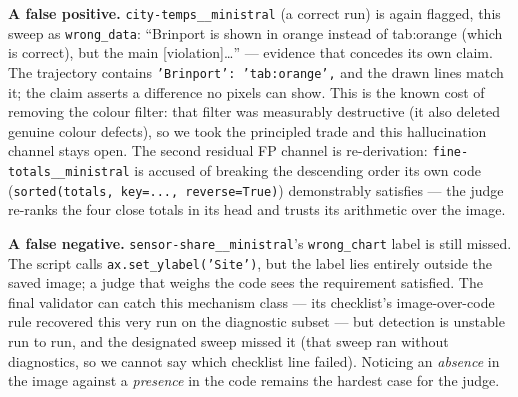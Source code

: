 \documentclass[11pt]{article}
\begin{document}
\textbf{A false positive.} \texttt{city-temps\_\_ministral} (a correct
run) is again flagged, this sweep as \texttt{wrong\_data}: ``Brinport
is shown in orange instead of tab:orange (which is correct), but the
main [violation]\ldots'' --- evidence that concedes its own claim. The
trajectory contains \texttt{'Brinport': 'tab:orange',} and the drawn
lines match it; the claim asserts a difference no pixels can show.
This is the known cost of removing the colour filter: that filter was
measurably destructive (it also deleted genuine colour defects), so we
took the principled trade and this hallucination channel stays open. The
second residual FP channel is re-derivation: \texttt{fine-totals\_\_ministral}
is accused of breaking the descending order its own code
(\texttt{sorted(totals, key=..., reverse=True)}) demonstrably satisfies
--- the judge re-ranks the four close totals in its head and trusts its
arithmetic over the image.

\textbf{A false negative.} \texttt{sensor-share\_\_ministral}'s
\texttt{wrong\_chart} label is still missed. The script calls
\texttt{ax.set\_ylabel('Site')}, but the label lies entirely outside the
saved image; a judge that weighs the code sees the requirement satisfied.
The final validator can catch this mechanism class --- its checklist's
image-over-code rule recovered this very run on the diagnostic subset ---
but detection is unstable run to run, and the designated sweep missed it
(that sweep ran without diagnostics, so we cannot say which checklist
line failed). Noticing an \emph{absence} in the image against a
\emph{presence} in the code remains the hardest case for the judge.
\end{document}
